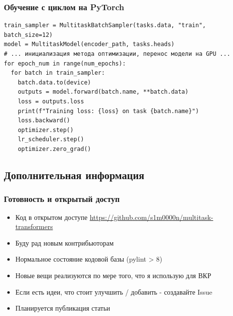 \documentclass[aspectratio=169]{beamer}
\begin{document}
\begin{frame}[fragile]
	\frametitle{Обучение с циклом на PyTorch}
	\begin{verbatim}
train_sampler = MultitaskBatchSampler(tasks.data, "train", batch_size=12)
model = MultitaskModel(encoder_path, tasks.heads)
# ... инициализация метода оптимизации, перенос модели на GPU ...
for epoch_num in range(num_epochs):
  for batch in train_sampler:
    batch.data.to(device)
    outputs = model.forward(batch.name, **batch.data)
    loss = outputs.loss
    print(f"Training loss: {loss} on task {batch.name}")
    loss.backward()
    optimizer.step()
    lr_scheduler.step()
    optimizer.zero_grad()
	\end{verbatim}
\end{frame}

\subsection{Дополнительная информация}

\begin{frame}
	\frametitle{Готовность и открытый доступ}
	\begin{itemize}
		\item Код в открытом доступе \url{https://github.com/s1m0000n/multitask-transformers}
		\item Буду рад новым контрибьюторам
		\item Нормальное состояние кодовой базы (pylint > 8)
		\item Новые вещи реализуются по мере того, что я использую для ВКР
		\item Если есть идеи, что стоит улучшить / добавить - создавайте Issue
		\item Планируется публикация статьи
	\end{itemize}
\end{frame}


\section[Исследование многозадачных трансформеров]{}
\end{document}
